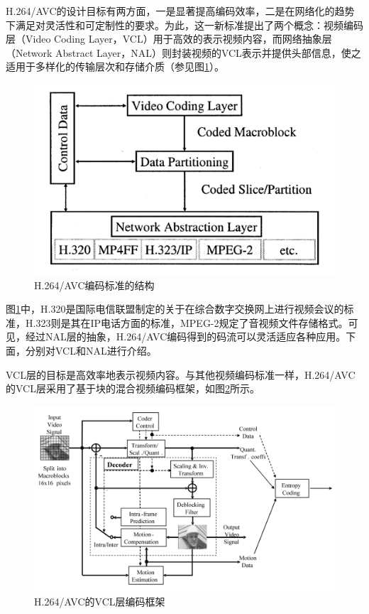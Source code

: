 H.264/AVC的设计目标有两方面，一是显著提高编码效率，二是在网络化的趋势下满足对灵活性和可定制性的要求。为此，这一新标准提出了两个概念：视频编码层（Video Coding Layer，VCL）用于高效的表示视频内容，而网络抽象层（Network Abstract Layer，NAL）则封装视频的VCL表示并提供头部信息，使之适用于多样化的传输层次和存储介质（参见图\ref{fig:02}\supercite{H.264-Overview}）。

\begin{figure}[h]
	\centering
	\includegraphics[width = 0.6\linewidth]{clip/02.png}
	\caption{H.264/AVC编码标准的结构\label{fig:02}}
\end{figure}

图\ref{fig:02}中，H.320是国际电信联盟制定的关于在综合数字交换网上进行视频会议的标准，H.323则是其在IP电话方面的标准，MPEG-2规定了音视频文件存储格式。可见，经过NAL层的抽象，H.264/AVC编码得到的码流可以灵活适应各种应用。下面，分别对VCL和NAL进行介绍。

VCL层的目标是高效率地表示视频内容。与其他视频编码标准一样，H.264/AVC的VCL层采用了基于块的混合视频编码框架，如图\ref{fig:03}\supercite{H.264-Overview}所示。

\begin{figure}[h]
	\centering
	\includegraphics[width = 1.0\linewidth]{clip/03.png}
	\caption{H.264/AVC的VCL层编码框架\label{fig:03}}
\end{figure}

